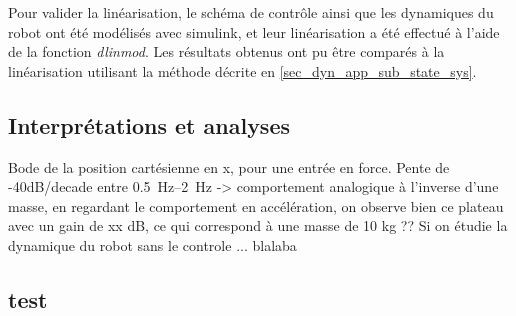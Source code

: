 \documentclass[12pt, a4paper]{article} %
\numberwithin{equation}{section}
\begin{document}
	Pour valider la linéarisation, le schéma de contrôle ainsi que les dynamiques du robot ont été modélisés avec simulink, et leur linéarisation a été effectué à l'aide de la fonction \textit{dlinmod}. Les résultats obtenus ont pu être comparés à la linéarisation utilisant la méthode décrite en \cref{sec_dyn_app_sub_state_sys}.
	\subsection{Interprétations et analyses}
	Bode de la position cartésienne en x, pour une entrée en force. Pente de -40dB/decade entre \SIrange{0.5}{2}{\hertz} -> comportement analogique à l'inverse d'une masse, en regardant le comportement en accélération, on observe bien ce plateau avec un gain de xx dB, ce qui correspond à une masse de 10 kg ??
	Si on étudie la dynamique du robot sans le controle ... blalaba
\clearpage
\begin{appendices}
	\section{test}
	
\end{appendices}
	

\newpage
	
\end{document}
